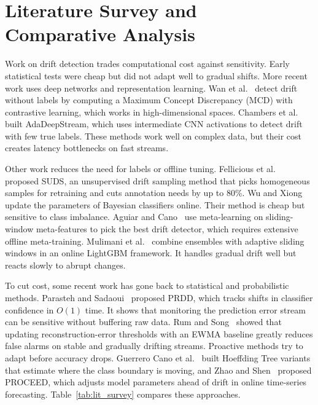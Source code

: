 \documentclass[conference]{IEEEtran}
\begin{document}
\section{Literature Survey and Comparative Analysis}
Work on drift detection trades computational cost against sensitivity.
Early statistical tests were cheap but did not adapt well to gradual shifts.
More recent work uses deep networks and representation learning.
Wan et al.~\cite{wan2024} detect drift without labels by computing a Maximum Concept Discrepancy (MCD) with contrastive learning, which works in high-dimensional spaces.
Chambers et al.~\cite{chambers2023} built AdaDeepStream, which uses intermediate CNN activations to detect drift with few true labels.
These methods work well on complex data, but their cost creates latency bottlenecks on fast streams.

Other work reduces the need for labels or offline tuning.
Fellicious et al.~\cite{fellicious2024} proposed SUDS, an unsupervised drift sampling method that picks homogeneous samples for retraining and cuts annotation needs by up to 80\%.
Wu and Xiong~\cite{wu2023} update the parameters of Bayesian classifiers online. Their method is cheap but sensitive to class imbalance.
Aguiar and Cano~\cite{aguiar2023} use meta-learning on sliding-window meta-features to pick the best drift detector, which requires extensive offline meta-training.
Mulimani et al.~\cite{mulimani2024} combine ensembles with adaptive sliding windows in an online LightGBM framework. It handles gradual drift well but reacts slowly to abrupt changes.

To cut cost, some recent work has gone back to statistical and probabilistic methods.
Parasteh and Sadaoui~\cite{parasteh2024} proposed PRDD, which tracks shifts in classifier confidence in $O(1)$ time. It shows that monitoring the prediction error stream can be sensitive without buffering raw data.
Rum and Song~\cite{rum2026} showed that updating reconstruction-error thresholds with an EWMA baseline greatly reduces false alarms on stable and gradually drifting streams.
Proactive methods try to adapt before accuracy drops.
Guerrero Cano et al.~\cite{cano2026} built Hoeffding Tree variants that estimate where the class boundary is moving, and Zhao and Shen~\cite{zhao2025} proposed PROCEED, which adjusts model parameters ahead of drift in online time-series forecasting.
Table~\ref{tab:lit_survey} compares these approaches.
\end{document}
